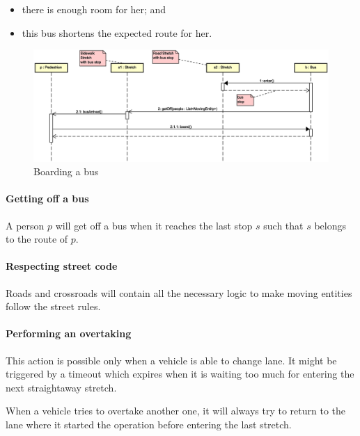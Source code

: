 \begin{itemize}
  \item there is enough room for her; and
  \item this bus shortens the expected route for her.
\end{itemize}

\begin{figure}[H]
  \centering
  \includegraphics[width=\columnwidth,trim=1 0 0 0,clip]
    {sections/images/solution/bus-boarding.eps}
  \caption{Boarding a bus}
  \label{fig:app-inter-board-bus}
\end{figure}

\paragraph{Getting off a bus} A person $p$ will get off a bus when it reaches
the last stop $s$ such that $s$ belongs to the route of $p$.

\paragraph{Respecting street code} Roads and crossroads will contain all the
necessary logic to make moving entities follow the street rules.

\paragraph{Performing an overtaking} This action is possible only when a
vehicle is able to change lane. It might be triggered by a timeout which
expires when it is waiting too much for entering the next straightaway stretch.

When a vehicle tries to overtake another one, it will always try to return to
the lane where it started the operation before entering the last stretch.


